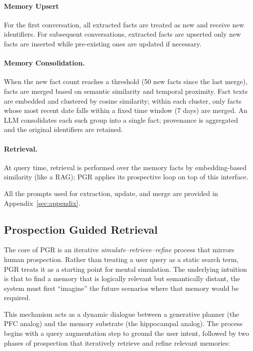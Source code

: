 \vspace{-0.2cm}
\paragraph{Memory Upsert} For the first conversation, all extracted facts are treated as new and receive new identifiers. For subsequent conversations, extracted facts are upserted \ie only new facts are inserted while pre-existing ones are updated if necessary. 

\vspace{-0.2cm}
\paragraph{Memory Consolidation.} When the new fact count reaches a threshold (50 new facts since the last merge), facts are merged based on semantic similarity and temporal proximity. Fact texts are embedded and clustered by cosine similarity; within each cluster, only facts whose most recent date falls within a fixed time window (7 days) are merged. An LLM consolidates each such group into a single fact; provenance is aggregated and the original identifiers are retained.

\vspace{-0.2cm}
\paragraph{Retrieval.} At query time, retrieval is performed over the memory facts by embedding-based similarity (like a RAG); PGR applies its prospective loop on top of this interface. 

\noindent
All the prompts used for extraction, update, and merge are provided in Appendix~\ref{sec:appendix}.


\subsection{Prospection Guided Retrieval}
\label{sec:pgr-retrieval}

The core of PGR is an iterative \emph{simulate--retrieve--refine} process that mirrors human prospection. Rather than treating a user query as a static search term, PGR treats it as a starting point for mental simulation. The underlying intuition is that to find a memory that is logically relevant but semantically distant, the system must first ``imagine'' the future scenarios where that memory would be required. 

This mechanism acts as a dynamic dialogue between a generative planner (the PFC analog) and the memory substrate (the hippocampal analog). The process begins with a query augmentation step to ground the user intent, followed by two phases of prospection that iteratively retrieve and refine relevant memories:

